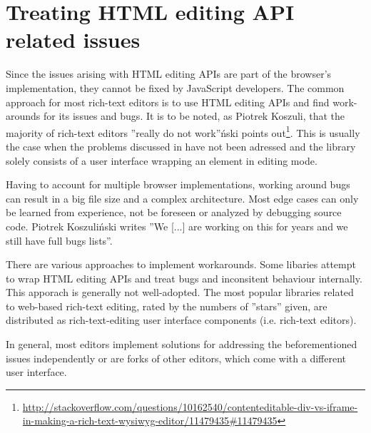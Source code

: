 
\section{Treating HTML editing API related issues}

Since the issues arising with HTML editing APIs are part of the browser's implementation, they cannot be fixed by JavaScript developers. The common approach for most rich-text editors is to use HTML editing APIs and find work-arounds for its issues and bugs. It is to be noted, as Piotrek Koszuli, that the majority of rich-text editors ''really do not work''\'{n}ski points out\footnote{\url{http://stackoverflow.com/questions/10162540/contenteditable-div-vs-iframe-in-making-a-rich-text-wysiwyg-editor/11479435\#11479435}}. This is usually the case when the problems discussed in  have not been adressed and the library solely consists of a user interface wrapping an element in editing mode.

Having to account for multiple browser implementations, working around bugs can result in a big file size and a complex architecture. Most edge cases can only be learned from experience, not be foreseen or analyzed by debugging source code. Piotrek Koszuli\'{n}ski writes ''We [...] are working on this for years and we still have full bugs lists''\cite{sopp}.

There are various approaches to implement workarounds. Some libaries attempt to wrap HTML editing APIs and treat bugs and inconsitent behaviour internally. This apporach is generally not well-adopted. The most popular libraries related to web-based rich-text editing, rated by the numbers of ''stars'' given, are distributed as rich-text-editing user interface components (i.e. rich-text editors).

In general, most editors implement solutions for addressing the beforementioned issues independently or are forks of other editors, which come with a different user interface.




